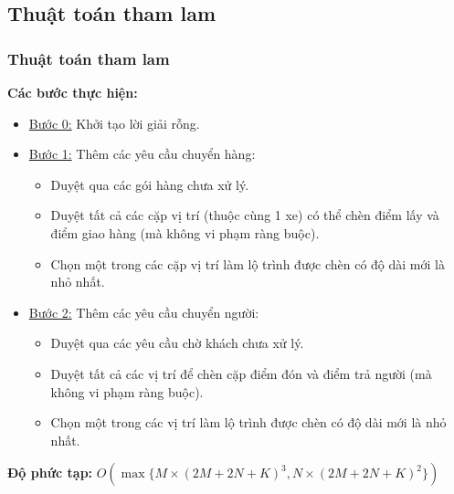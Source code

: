 \documentclass{beamer}
\begin{document}
	\subsection{Thuật toán tham lam}
	\begin{frame}
		\frametitle{Thuật toán tham lam}
		\textbf{Các bước thực hiện:}
		\begin{itemize}
			\item \underline{Bước 0:} Khởi tạo lời giải rỗng.
			\item {
				\underline{Bước 1:} Thêm các yêu cầu chuyển hàng:
				\begin{itemize}
					\item Duyệt qua các gói hàng chưa xử lý.
					\item Duyệt tất cả các cặp vị trí (thuộc cùng 1 xe) có thể chèn điểm lấy và điểm giao hàng (mà không vi phạm ràng buộc).
					\item Chọn một trong các cặp vị trí làm lộ trình được chèn có độ dài mới là nhỏ nhất.
				\end{itemize}
			}
			\item {
				\underline{Bước 2:} Thêm các yêu cầu chuyển người:
				\begin{itemize}
					\item Duyệt qua các yêu cầu chờ khách chưa xử lý.
					\item Duyệt tất cả các vị trí để chèn cặp điểm đón và điểm trả người (mà không vi phạm ràng buộc).
					\item Chọn một trong các vị trí làm lộ trình được chèn có độ dài mới là nhỏ nhất.
				\end{itemize}
			}
		\end{itemize}
		\textbf{Độ phức tạp:} $O(\max \{ M\times (2M+2N+K)^3, N\times (2M+2N+K)^2 \})$
	\end{frame}
\end{document}
